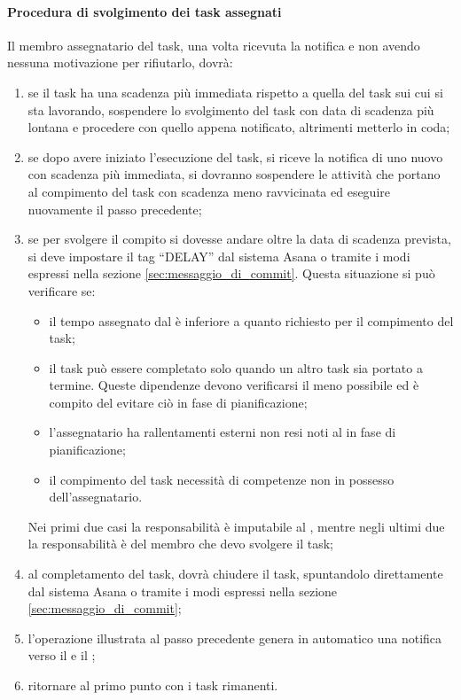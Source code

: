 			\paragraph{Procedura di svolgimento dei task assegnati}
			Il membro assegnatario del task, una volta ricevuta la notifica e non avendo nessuna motivazione per rifiutarlo, dovrà:
				\begin{enumerate}
					\item se il task ha una scadenza più immediata rispetto a quella del task sui cui si sta lavorando, sospendere lo svolgimento del task con data di scadenza più lontana e procedere con quello appena notificato, altrimenti metterlo in coda;
					\item se dopo avere iniziato l'esecuzione del task, si riceve la notifica di uno nuovo con scadenza più immediata, si dovranno sospendere le attività che portano al compimento del task con scadenza meno ravvicinata ed eseguire nuovamente il passo precedente;
					\item se per svolgere il compito si dovesse andare oltre la data di scadenza prevista, si deve impostare il tag ``DELAY'' dal sistema Asana o tramite i modi espressi nella sezione \ref{sec:messaggio_di_commit}. \newline
					Questa situazione si può verificare se:
					 	\begin{itemize}
							\item il tempo assegnato dal \roleProjectManager{} è inferiore a quanto richiesto per il compimento del task;
							\item il task può essere completato solo quando un altro task sia portato a termine. Queste dipendenze devono verificarsi il meno possibile ed è compito del \roleProjectManager{} evitare ciò in fase di pianificazione;
					 		\item l'assegnatario ha rallentamenti esterni non resi noti al \roleProjectManager{} in fase di pianificazione;
							\item il compimento del task necessità di competenze non in possesso dell'assegnatario.
					 	\end{itemize}
					\noindent
					Nei primi due casi la responsabilità è imputabile al \roleProjectManager, mentre negli ultimi due la responsabilità è del membro che devo svolgere il task;
					\item al completamento del task, dovrà chiudere il task, spuntandolo direttamente dal sistema Asana o tramite i modi espressi nella sezione \ref{sec:messaggio_di_commit};
					\item l'operazione illustrata al passo precedente genera in automatico una notifica verso il \roleVerifier{} e il \roleProjectManager;
					\item ritornare al primo punto con i task rimanenti.

				\end{enumerate}

